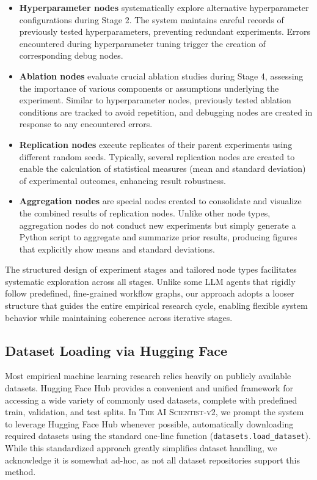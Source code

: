 \documentclass[11pt, a4paper]{include/gdm_format}
\newcommand{\ouralgo}{\textsc{The AI Scientist-v2}\xspace}
\begin{document}
\begin{itemize}
\item \textbf{Hyperparameter nodes} systematically explore alternative hyperparameter configurations during Stage 2. The system maintains careful records of previously tested hyperparameters, preventing redundant experiments. Errors encountered during hyperparameter tuning trigger the creation of corresponding debug nodes.
\item \textbf{Ablation nodes} evaluate crucial ablation studies during Stage 4, assessing the importance of various components or assumptions underlying the experiment. Similar to hyperparameter nodes, previously tested ablation conditions are tracked to avoid repetition, and debugging nodes are created in response to any encountered errors.
\item \textbf{Replication nodes} execute replicates of their parent experiments using different random seeds. Typically, several replication nodes are created to enable the calculation of statistical measures (mean and standard deviation) of experimental outcomes, enhancing result robustness.
\item \textbf{Aggregation nodes} are special nodes created to consolidate and visualize the combined results of replication nodes. Unlike other node types, aggregation nodes do not conduct new experiments but simply generate a Python script to aggregate and summarize prior results, producing figures that explicitly show means and standard deviations.
\end{itemize}

The structured design of experiment stages and tailored node types facilitates systematic exploration across all stages.
Unlike some LLM agents that rigidly follow predefined, fine-grained workflow graphs, our approach adopts a looser structure that guides the entire empirical research cycle, enabling flexible system behavior while maintaining coherence across iterative stages.

\subsection{Dataset Loading via Hugging Face}

Most empirical machine learning research relies heavily on publicly available datasets. Hugging Face Hub provides a convenient and unified framework for accessing a wide variety of commonly used datasets, complete with predefined train, validation, and test splits. In \ouralgo, we prompt the system to leverage Hugging Face Hub whenever possible, automatically downloading required datasets using the standard one-line function ({\tt datasets.load\_dataset}).
While this standardized approach greatly simplifies dataset handling, we acknowledge it is somewhat ad-hoc, as not all dataset repositories support this method.
    
\end{document}
